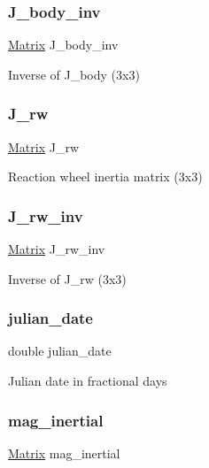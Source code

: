 \subsubsection{\texorpdfstring{J\_body\_inv}{J\_body\_inv}}
{\footnotesize\ttfamily \mbox{\hyperlink{struct___matrix}{Matrix}} J\+\_\+body\+\_\+inv}

Inverse of J\+\_\+body (3x3) \mbox{\label{struct_a_c_s_type_ae3e39e9013f49cf0f58982ab30dff4e5}} 
\subsubsection{\texorpdfstring{J\_rw}{J\_rw}}
{\footnotesize\ttfamily \mbox{\hyperlink{struct___matrix}{Matrix}} J\+\_\+rw}

Reaction wheel inertia matrix (3x3) \mbox{\label{struct_a_c_s_type_a1f6625b6635f3eb93819d23c8e73d3cd}} 
\subsubsection{\texorpdfstring{J\_rw\_inv}{J\_rw\_inv}}
{\footnotesize\ttfamily \mbox{\hyperlink{struct___matrix}{Matrix}} J\+\_\+rw\+\_\+inv}

Inverse of J\+\_\+rw (3x3) \mbox{\label{struct_a_c_s_type_a511e2e3264766d560a8f6cb81ac45fc9}} 
\subsubsection{\texorpdfstring{julian\_date}{julian\_date}}
{\footnotesize\ttfamily double julian\+\_\+date}

Julian date in fractional days \mbox{\label{struct_a_c_s_type_a3b8cd1112080cab70c421f3147c4610a}} 
\subsubsection{\texorpdfstring{mag\_inertial}{mag\_inertial}}
{\footnotesize\ttfamily \mbox{\hyperlink{struct___matrix}{Matrix}} mag\+\_\+inertial}

